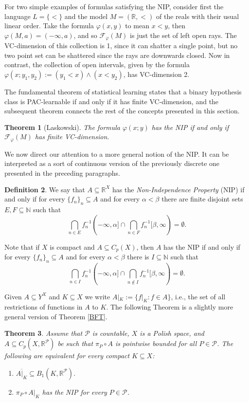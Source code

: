\documentclass[psamsfonts]{amsart}
\newtheorem{thm}{Theorem}[section]
\theoremstyle{definition}
\newtheorem{defn}[thm]{Definition}
\theoremstyle{remark}
\numberwithin{equation}{section}
\begin{document}
For two simple examples of formulas satisfying the NIP, consider first the language $L=\{<\}$ and the model $M=(\mathbb R,<)$ of the reals with their usual linear order. Take the formula $\varphi(x,y)$ to mean $x<y$, then $\varphi(M,a)=(-\infty,a)$, and so $\mathcal F_\varphi(M)$ is just the set of left open rays. The VC-dimension of this collection is 1, since it can shatter a single point, but no two point set can be shattered since the rays are downwards closed. Now in contrast, the collection of open intervals, given by the formula $\varphi(x;y_1,y_2):=(y_1<x)\land(x<y_2)$, has VC-dimension 2.

The fundamental theorem of statistical learning states that a binary hypothesis class is PAC-learnable if and only if it has finite VC-dimension, and the subsequent theorem connects the rest of the concepts presented in this section.

\begin{thm}[Laskowski]
    The formula $\varphi(x;y)$ has the NIP if and only if $\mathcal F_\varphi(M)$ has finite VC-dimension.
\end{thm}

We now direct our attention to a more general notion of the NIP. It can be interpreted as a sort of continuous version of the previously discrete one presented in the preceding paragraphs.

\begin{defn}
    We say that $A\subseteq \mathbb{R}^X$ has the \emph{Non-Independence Property} (NIP) if and only if for every $\{f_n\}_n\subseteq A$ and for every $\alpha<\beta$ there are finite disjoint sets $E,F\subseteq\mathbb{N}$ such that
    $$\bigcap_{n\in E}f_n^{-1}(-\infty,\alpha]\cap\bigcap_{n\in F}f_n^{-1}[\beta,\infty)=\emptyset.$$
\end{defn}

Note that if $X$ is compact and $A\subseteq C_p(X)$, then $A$ has the NIP if and only if for every $\{f_n\}_n\subseteq A$ and for every $\alpha<\beta$ there is $I\subseteq\mathbb{N}$ such that
$$\bigcap_{n\in I}f_n^{-1}(-\infty,\alpha]\cap\bigcap_{n\notin I}f_n^{-1}[\beta,\infty)=\emptyset.$$

Given $A\subseteq Y^X$ and $K\subseteq X$ we write $A|_K:=\{f|_K:f\in A\}$, i.e., the set of all restrictions of functions in $A$ to $K$. The following Theorem is a slightly more general version of Theorem \ref{BFT}.

\begin{thm}\label{Generalized BFT}
    Assume that $\mathcal P$ is countable, $X$ is a Polish space, and $A\subseteq C_p(X,\mathbb R^\mathcal P)$ be such that $\pi_P\circ A$ is pointwise bounded for all $P\in\mathcal{P}$. The following are equivalent for every compact $K\subseteq X$:

    \begin{enumerate}
        \item $\overline{A|_K}\subseteq B_1(K,\mathbb R^\mathcal P)$.
        \item $\pi_P\circ A|_K$ has the NIP for every $P\in\mathcal P$.
    \end{enumerate}
\end{thm}
\end{document}
